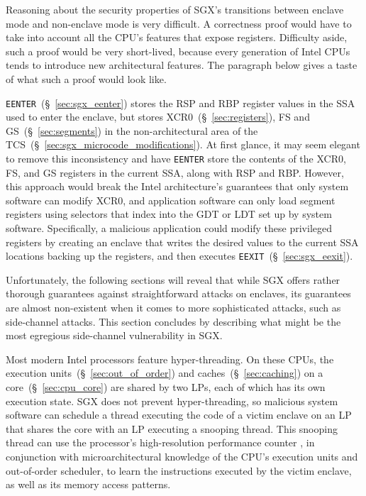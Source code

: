 Reasoning about the security properties of SGX's transitions between enclave
mode and non-enclave mode is very difficult. A correctness proof would have to
take into account all the CPU's features that expose registers. Difficulty
aside, such a proof would be very short-lived, because every generation of
Intel CPUs tends to introduce new architectural features. The paragraph below
gives a taste of what such a proof would look like.

\texttt{EENTER}~(\S~\ref{sec:sgx_eenter}) stores the RSP and RBP register
values in the SSA used to enter the enclave, but stores
XCR0~(\S~\ref{sec:registers}), FS and GS~(\S~\ref{sec:segments}) in the
non-architectural area of the TCS~(\S~\ref{sec:sgx_microcode_modifications}).
At first glance, it may seem elegant to remove this inconsistency and have
\texttt{EENTER} store the contents of the XCR0, FS, and GS registers in the
current SSA, along with RSP and RBP. However, this approach would break the
Intel architecture's guarantees that only system software can modify XCR0, and
application software can only load segment registers using selectors that index
into the GDT or LDT set up by system software.  Specifically, a malicious
application could modify these privileged registers by creating an enclave that
writes the desired values to the current SSA locations backing up the
registers, and then executes \texttt{EEXIT}~(\S~\ref{sec:sgx_eexit}).

Unfortunately, the following sections will reveal that while SGX offers rather
thorough guarantees against straightforward attacks on enclaves, its guarantees are almost
non-existent when it comes to more sophisticated attacks, such as side-channel
attacks. This section concludes by describing what might be the most egregious
side-channel vulnerability in SGX.

Most modern Intel processors feature hyper-threading. On these CPUs, the
execution units~(\S~\ref{sec:out_of_order}) and caches~(\S~\ref{sec:caching})
on a core~(\S~\ref{sec:cpu_core}) are shared by two LPs, each of which has its
own execution state. SGX does not prevent hyper-threading, so malicious system
software can schedule a thread executing the code of a victim enclave on an
LP that shares the core with an LP executing a snooping thread. This snooping
thread can use the processor's high-resolution performance counter
\cite{petters1999making}, in conjunction with microarchitectural knowledge of
the CPU's execution units and out-of-order scheduler, to learn the instructions
executed by the victim enclave, as well as its memory access patterns.

